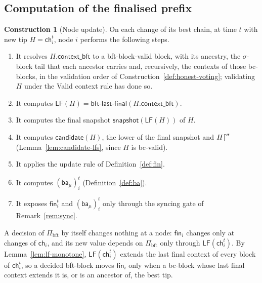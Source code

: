 \documentclass[11pt,a4paper]{article}
\theoremstyle{definition}
\newtheorem{construction}[theorem]{Construction}
\newcommand{\bft}{\mathrm{bft}}
\newcommand{\ch}{\mathsf{ch}}
\newcommand{\Pibft}{\Pi_{\bft}}
\newcommand{\bftlastfinal}{\mathsf{bft\text{-}last\text{-}final}}
\newcommand{\contextbft}{\mathsf{context\_bft}}
\newcommand{\snapshot}{\mathsf{snapshot}}
\newcommand{\LF}{\mathsf{LF}}
\newcommand{\candidate}{\mathsf{candidate}}
\newcommand{\fin}{\mathsf{fin}}
\newcommand{\ba}{\mathsf{ba}}
\begin{document}
\subsection{Computation of the finalised prefix}\label{sec:led-compute}

\begin{construction}[Node update]\label{def:node-update}
On each change of its best chain, at time $t$ with new tip $H = \ch_i^t$,
node $i$ performs the following steps.
\begin{enumerate}[label=(\arabic*)]
\item It resolves $H.\contextbft$ to a bft-block-valid block, with its
  ancestry, the $\sigma$-block tail that each ancestor carries and,
  recursively, the contexts of those bc-blocks, in the validation order of
  Construction~\ref{def:honest-voting}; validating $H$ under the Valid
  context rule has done so.
\item It computes $\LF(H) = \bftlastfinal(H.\contextbft)$.
\item It computes the final snapshot $\snapshot(\LF(H))$ of $H$.
\item It computes $\candidate(H)$, the lower of the final snapshot and
  $H\trunc{\sigma}$ (Lemma~\ref{lem:candidate-lfs}, since $H$ is bc-valid).
\item It applies the update rule of Definition~\ref{def:fin}.
\item It computes $(\ba_\mu)_i^t$ (Definition~\ref{def:ba}).
\item It exposes $\fin_i^t$ and $(\ba_\mu)_i^t$ only through the syncing
  gate of Remark~\ref{rem:sync}.
\end{enumerate}
\end{construction}

A decision of $\Pibft$ by itself changes nothing at a node: $\fin_i$ changes
only at changes of $\ch_i$, and its new value depends on $\Pibft$ only through
$\LF(\ch_i^t)$. By Lemma~\ref{lem:lf-monotone}, $\LF(\ch_i^t)$ extends the
last final context of every block of $\ch_i^t$, so a decided bft-block moves
$\fin_i$ only when a bc-block whose last final context extends it is, or is
an ancestor of, the best tip.
\end{document}
